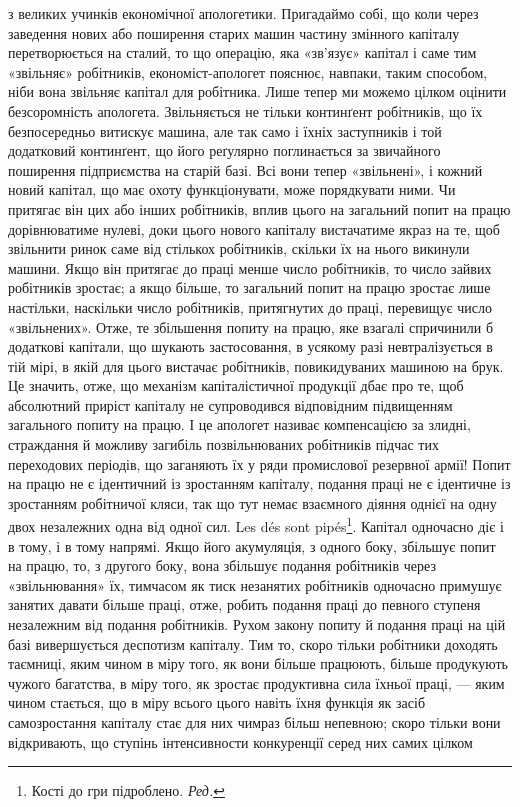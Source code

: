 \parcont{}  %
з великих учинків економічної апологетики. Пригадаймо собі,
що коли через заведення нових або поширення старих машин
частину змінного капіталу перетворюється на сталий, то що
операцію, яка «зв’язує» капітал і саме тим «звільняє» робітників,
економіст-апологет пояснює, навпаки, таким способом,
ніби вона звільняє капітал для робітника. Лише тепер ми можемо
цілком оцінити безсоромність апологета. Звільняється не тільки
континґент робітників, що їх безпосередньо витискує машина,
але так само і їхніх заступників і той додатковий континґент,
що його реґулярно поглинається за звичайного поширення підприємства
на старій базі. Всі вони тепер «звільнені», і кожний
новий капітал, що має охоту функціонувати, може порядкувати
ними. Чи притягає він цих або інших робітників, вплив цього
на загальний попит на працю дорівнюватиме нулеві, доки цього
нового капіталу вистачатиме якраз на те, щоб звільнити ринок
саме від стількох робітників, скільки їх на нього викинули машини.
Якщо він притягає до праці менше число робітників, то
число зайвих робітників зростає; а якщо більше, то загальний
попит на працю зростає лише настільки, наскільки число робітників,
притягнутих до праці, перевищує число «звільнених».
Отже, те збільшення попиту на працю, яке взагалі спричинили б
додаткові капітали, що шукають застосовання, в усякому разі
невтралізується в тій мірі, в якій для цього вистачає робітників,
повикидуваних машиною на брук. Це значить, отже, що механізм
капіталістичної продукції дбає про те, щоб абсолютний приріст
капіталу не супроводився відповідним підвищенням загального
попиту на працю. І це апологет називає компенсацією за злидні,
страждання й можливу загибіль позвільнюваних робітників підчас
тих переходових періодів, що заганяють їх у ряди промислової
резервної армії! Попит на працю не є ідентичний із зростанням
капіталу, подання праці не є ідентичне із зростанням робітничої
кляси, так що тут немає взаємного діяння однієї на одну двох
незалежних одна від одної сил. Les dés sont pipés\footnote*{
Кості до гри підроблено. \emph{Ред.}
}. Капітал
одночасно діє і в тому, і в тому напрямі. Якщо його акумуляція,
з одного боку, збільшує попит на працю, то, з другого боку,
вона збільшує подання робітників через «звільнювання» їх,
тимчасом як тиск незанятих робітників одночасно примушує
занятих давати більше праці, отже, робить подання праці до
певного ступеня незалежним від подання робітників. Рухом закону
попиту й подання праці на цій базі вивершується деспотизм
капіталу. Тим то, скоро тільки робітники доходять таємниці,
яким чином в міру того, як вони більше працюють, більше продукують
чужого багатства, в міру того, як зростає продуктивна
сила їхньої праці, — яким чином стається, що в міру всього цього
навіть їхня функція як засіб самозростання капіталу стає для
них чимраз більш непевною; скоро тільки вони відкривають,
що ступінь інтенсивности конкуренції серед них самих цілком
\parbreak{}  %
